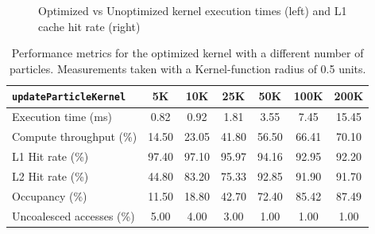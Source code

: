 \begin{figure}[ht]
{
    }
    \caption{Optimized vs Unoptimized kernel execution times (left) and L1 cache hit rate (right)}\label{fig:perf_graphs}
\end{figure}


\begin{table}[ht]
\centering
    \begin{adjustbox}{max width=\textwidth}
        \begin{tabular}{@{}lcccccc@{}}
            \toprule
            \texttt{updateParticleKernel} & \textbf{5K} & \textbf{10K} & \textbf{25K} & \textbf{50K} & \textbf{100K} & \textbf{200K} \\
            \midrule
                Execution time (ms)      & 0.82   & 0.92   & 1.81   & 3.55   & 7.45   & 15.45  \\
                Compute throughput (\%)  & 14.50  & 23.05  & 41.80  & 56.50  & 66.41  & 70.10  \\
                L1 Hit rate (\%)         & 97.40  & 97.10  & 95.97  & 94.16  & 92.95  & 92.20  \\
                L2 Hit rate (\%)         & 44.80  & 83.20  & 75.33  & 92.85  & 91.90  & 91.70  \\
                Occupancy (\%)           & 11.50  & 18.80  & 42.70  & 72.40  & 85.42  & 87.49  \\
                Uncoalesced accesses (\%)& 5.00   & 4.00   & 3.00   & 1.00   & 1.00   & 1.00   \\
            \bottomrule
        \end{tabular}
    \end{adjustbox}
\caption{Performance metrics for the optimized kernel with a different number of particles. Measurements taken with a Kernel-function radius of 0.5 units.}\label{tab:perf_comparison}
\end{table}



